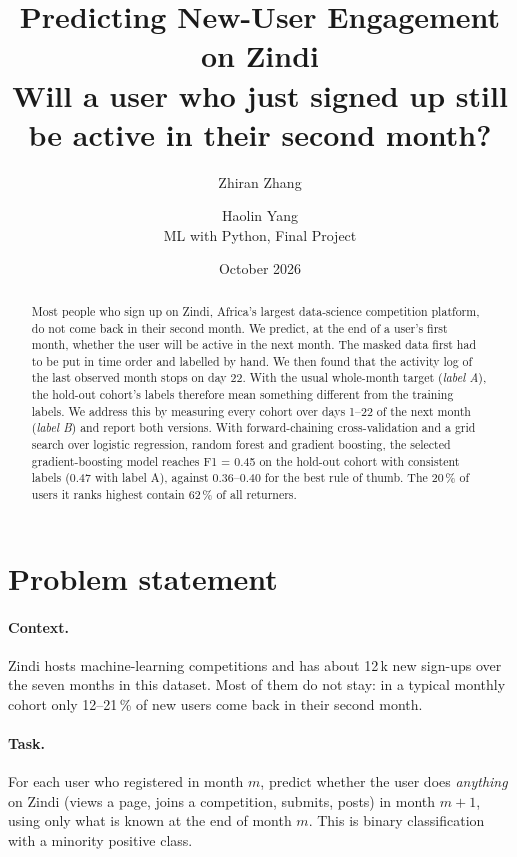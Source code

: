 \documentclass[11pt,a4paper]{article}
\title{\textbf{Predicting New-User Engagement on Zindi}\\[4pt]
\large Will a user who just signed up still be active in their second month?}
\author{Zhiran Zhang \and Haolin Yang\\[2pt] \small ML with Python, Final Project}
\date{October 2026}
\begin{document}
\maketitle

\begin{abstract}
\noindent
Most people who sign up on Zindi, Africa's largest data-science competition platform, do not come back in their second month.
We predict, at the end of a user's first month, whether the user will be active in the next month.
The masked data first had to be put in time order and labelled by hand.
We then found that the activity log of the last observed month stops on day 22. With the usual whole-month target (\emph{label A}),
the hold-out cohort's labels therefore mean something different from the training labels.
We address this by measuring every cohort over days 1--22 of the next month (\emph{label B}) and report both versions.
With forward-chaining cross-validation and a grid search over logistic regression, random forest and gradient boosting,
the selected gradient-boosting model reaches F1 = 0.45 on the hold-out cohort with consistent labels (0.47 with label A),
against 0.36--0.40 for the best rule of thumb. The 20\,\% of users it ranks highest contain 62\,\% of all returners.
\end{abstract}

\section{Problem statement}\label{sec:problem}

\paragraph{Context.} Zindi hosts machine-learning competitions and has about 12\,k new sign-ups over the seven months in this dataset.
Most of them do not stay: in a typical monthly cohort only 12--21\,\% of new users come back in their second month.

\paragraph{Task.} For each user who registered in month $m$, predict whether the user does \emph{anything} on Zindi
(views a page, joins a competition, submits, posts) in month $m+1$, using only what is known at the end of month $m$.
This is binary classification with a minority positive class.
\end{document}
